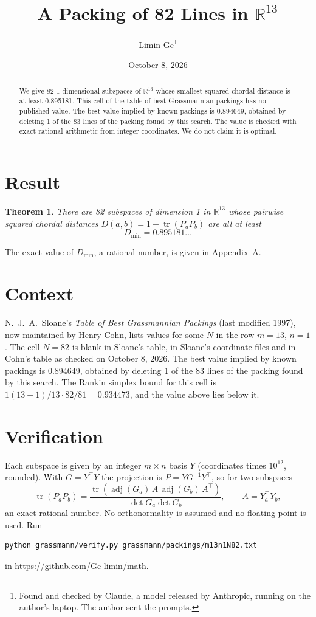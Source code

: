 \documentclass[11pt,a4paper]{article}
\title{A Packing of 82 Lines in $\mathbb{R}^{13}$}
\author{Limin Ge\thanks{Found and checked by Claude, a model released by Anthropic, running on the author's laptop. The author sent the prompts.}}
\date{October 8, 2026}
\newtheorem*{theorem}{Theorem}
\begin{document}
\maketitle
\begin{abstract}
We give 82 1-dimensional subspaces of $\mathbb{R}^{13}$ whose smallest squared chordal distance is at least 0.895181. This cell of the table of best Grassmannian packings has no published value. The best value implied by known packings is 0.894649, obtained by deleting 1 of the 83 lines of the packing found by this search. The value is checked with exact rational arithmetic from integer coordinates. We do not claim it is optimal.
\end{abstract}

\section{Result}
\begin{theorem}
There are 82 subspaces of dimension 1 in $\mathbb{R}^{13}$ whose pairwise squared chordal distances $D(a,b) = 1 - \operatorname{tr}(P_aP_b)$ are all at least
\[ D_{\min} = 0.895181\ldots \]
\end{theorem}
The exact value of $D_{\min}$, a rational number, is given in Appendix~A.


\section{Context}
N.~J.~A.~Sloane's \emph{Table of Best Grassmannian Packings} (last modified 1997), now maintained by Henry Cohn, lists values for some $N$ in the row $m=13$, $n=1$. The cell $N=82$ is blank in Sloane's table, in Sloane's coordinate files and in Cohn's table as checked on October 8, 2026. The best value implied by known packings is 0.894649, obtained by deleting 1 of the 83 lines of the packing found by this search. The Rankin simplex bound for this cell is $1(13-1)/13\cdot 82/81 = 0.934473$, and the value above lies below it.


\section{Verification}
Each subspace is given by an integer $m\times n$ basis $Y$ (coordinates times $10^{12}$, rounded). With $G=Y^\top Y$ the projection is $P=YG^{-1}Y^\top$, so for two subspaces
\[ \operatorname{tr}(P_aP_b)=\frac{\operatorname{tr}(\operatorname{adj}(G_a)\,A\,\operatorname{adj}(G_b)\,A^\top)}{\det G_a\det G_b},\qquad A=Y_a^\top Y_b, \]
an exact rational number. No orthonormality is assumed and no floating point is used. Run
\begin{verbatim}
python grassmann/verify.py grassmann/packings/m13n1N82.txt
\end{verbatim}
in \url{https://github.com/Ge-limin/math}.
\end{document}
